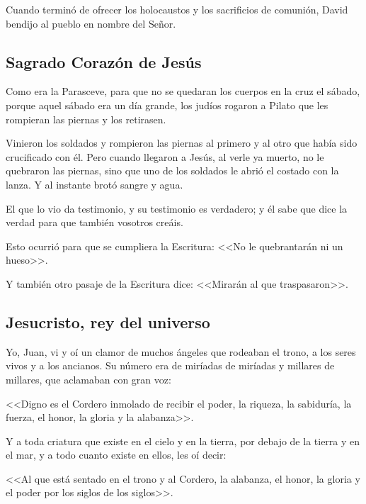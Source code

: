  Cuando terminó de 
ofrecer los holocaustos y los sacrificios de 
comunión, David bendijo al pueblo en nombre 
del Señor.

\subsection{Sagrado Corazón de Jesús}


 Como era la Parasceve, para que no se 
quedaran los cuerpos en la cruz el sábado, 
porque aquel sábado era un día grande, los 
judíos rogaron a Pilato que les rompieran las 
piernas y los retirasen.  

Vinieron los soldados y 
rompieron las piernas al primero y al otro que 
había sido crucificado con él. Pero cuando 
llegaron a Jesús, al verle ya muerto, no le 
quebraron las piernas, sino que uno de los 
soldados le abrió el costado con la lanza. Y al 
instante brotó sangre y agua. 

 El que lo vio da 
testimonio, y su testimonio es verdadero; y él 
sabe que dice la verdad para que también 
vosotros creáis. 

 Esto ocurrió para que se 
cumpliera la Escritura: <<No le quebrantarán ni 
un hueso>>.  

Y también otro pasaje de la 
Escritura dice: <<Mirarán al que traspasaron>>. 

\subsection{Jesucristo, rey del universo}



 Yo, Juan, vi y oí un clamor de muchos ángeles 
que rodeaban el trono, a los seres vivos y a los 
ancianos. Su número era de miríadas de 
miríadas y millares de millares, que aclamaban 
con gran voz: 

 <<Digno es el Cordero inmolado 
de recibir el poder, la riqueza, la sabiduría, la 
fuerza, el honor, la gloria y la alabanza>>. 

 Y a 
toda criatura que existe en el cielo y en la 
tierra, por debajo de la tierra y en el mar, y a 
todo cuanto existe en ellos, les oí decir:  

<<Al 
que está sentado en el trono y al Cordero, la 
alabanza, el honor, la gloria y el poder por los 
siglos de los siglos>>.  

